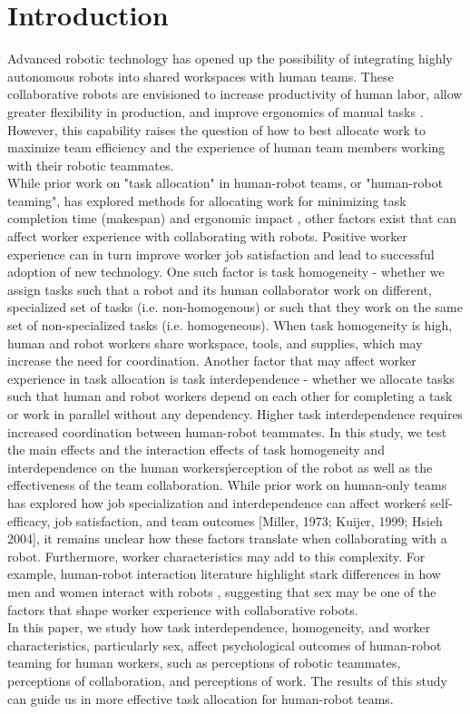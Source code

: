 \section{Introduction}
       Advanced robotic technology has opened up the possibility of integrating highly autonomous robots into shared workspaces with human teams.  These collaborative robots are envisioned to increase productivity of human labor, allow greater flexibility in production, and improve ergonomics of manual tasks \cite{peshkin1999cobots, tan2009human}.  However, this capability raises the question of how to best allocate work to maximize team efficiency and the experience of human team members working with their robotic teammates.\\
       While prior work on "task allocation" in human-robot teams, or "human-robot teaming", has explored methods for allocating work for minimizing task completion time (makespan) and ergonomic impact \cite{shah2011improved, gombolay2014decision, tsarouchi2017ijcim}, other factors exist that can affect worker experience with collaborating with robots. Positive worker experience can in turn improve worker job satisfaction and lead to successful adoption of new technology. One such factor is task homogeneity - whether we assign tasks  such that a robot and its human collaborator work on different, specialized set of tasks (i.e. non-homogenous) or such that they work on the same set of non-specialized tasks (i.e. homogeneous). When task homogeneity is high, human and robot workers share workspace, tools, and supplies, which may increase the need for coordination. Another factor that may affect worker experience in task allocation is task interdependence \cite{kiggundu1983task} - whether we allocate tasks such that human and robot workers depend on each other for completing a task or work in parallel without any dependency. Higher task interdependence requires increased coordination between human-robot teammates.  In this study, we test the main effects and the interaction effects of task homogeneity and interdependence on the human workers\' perception of the robot as well as the effectiveness of the team collaboration. While prior work on human-only teams has explored how job specialization and interdependence can affect worker\' s self-efficacy, job satisfaction, and team outcomes [Miller, 1973; Kuijer, 1999; Hsieh 2004], it remains unclear how these factors translate when collaborating with a robot.  Furthermore, worker characteristics may add to this complexity. For example, human-robot interaction literature highlight stark differences in how men and women interact with robots  \cite{schermerhorn2008robot}, suggesting that sex may be one of the factors that shape worker experience with collaborative robots.\\
       In this paper, we study how task interdependence, homogeneity, and worker characteristics, particularly sex, affect psychological outcomes of human-robot teaming for human workers, such as perceptions of robotic teammates, perceptions of collaboration, and perceptions of work. The results of this study can guide us in more effective task allocation for human-robot teams.
